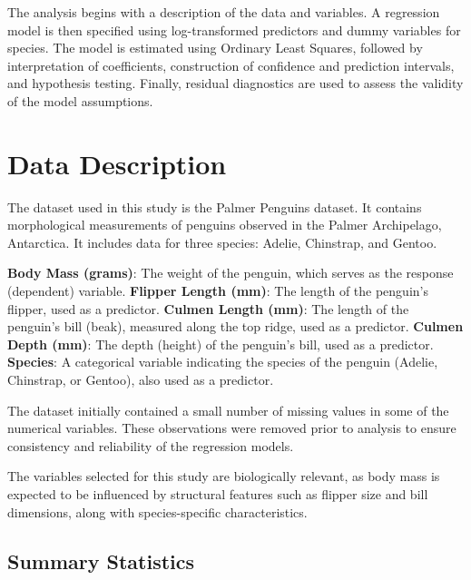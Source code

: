 \documentclass[12pt]{article}
\begin{document}
  The analysis begins with a description of the data and
  variables. A regression model is then specified using
  log-transformed predictors and dummy variables for species.
  The model is estimated using Ordinary Least Squares, followed
  by interpretation of coefficients, construction of
  confidence and prediction intervals, and hypothesis testing.
  Finally, residual diagnostics are used to assess the
  validity of the model assumptions.

  \section{Data Description}

  The dataset used in this study is the
  Palmer Penguins dataset.
  It contains morphological measurements of
  penguins observed in the
  Palmer Archipelago, Antarctica.
  It includes data for three species:
  Adelie, Chinstrap, and Gentoo.

  \begin{itemize}
      \ii \textbf{Body Mass (grams)}:
      The weight of the penguin,
      which serves as the response (dependent) variable.
      \ii \textbf{Flipper Length (mm)}:
      The length of the penguin’s flipper, used as a predictor.
      \ii \textbf{Culmen Length (mm)}:
      The length of the penguin’s bill (beak),
      measured along the top ridge,
      used as a predictor.
      \ii \textbf{Culmen Depth (mm)}:
      The depth (height) of the penguin’s bill,
      used as a predictor.
      \ii \textbf{Species}:
      A categorical variable indicating the
      species of the penguin
      (Adelie, Chinstrap, or Gentoo),
      also used as a predictor.
  \end{itemize}

  The dataset initially contained a small number of
  missing values in some of the numerical variables.
  These observations were removed prior to analysis to
  ensure consistency and reliability of the
  regression models.

  The variables selected for this study are
  biologically relevant, as body mass is expected to be
  influenced by structural features such as flipper size
  and bill dimensions,
  along with species-specific characteristics.

  \subsection{Summary Statistics}
\end{document}
